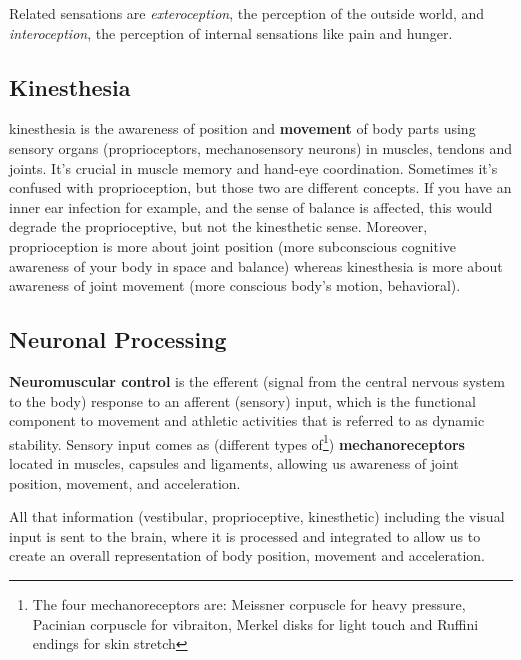 Related sensations are \textit{exteroception}, the perception of the outside world, and \textit{interoception}, the perception of internal sensations like pain and hunger.

\subsection{Kinesthesia}\label{subsec:kinesthesia}

\Gls{kinesthesia} is the awareness of position and \textbf{movement} of body parts using sensory organs (proprioceptors, mechanosensory neurons) in muscles, tendons and joints.
It's crucial in muscle memory and hand-eye coordination.
Sometimes it's confused with proprioception, but those two are different concepts.
If you have an inner ear infection for example, and the sense of balance is affected, this would degrade the proprioceptive, but not the kinesthetic sense.
Moreover, proprioception is more about joint position (more subconscious cognitive awareness of your body in space and balance) whereas kinesthesia is more about awareness of joint movement (more conscious body's motion, behavioral).

\subsection{Neuronal Processing}\label{subsec:neuronal-processing}

\textbf{Neuromuscular control} is the efferent (signal from the central nervous system to the body) response to an afferent (sensory) input, which is the functional component to movement and athletic activities that is referred to as dynamic stability.
Sensory input comes as (different types of\footnote{The four mechanoreceptors are: Meissner corpuscle for heavy pressure, Pacinian corpuscle for vibraiton, Merkel disks for light touch and Ruffini endings for skin stretch}) \textbf{mechanoreceptors} located in muscles, capsules and ligaments, allowing us awareness of joint position, movement, and acceleration.

All that information (vestibular, proprioceptive, kinesthetic) including the visual input is sent to the brain, where it is processed and integrated to allow us to create an overall representation of body position, movement and acceleration.
